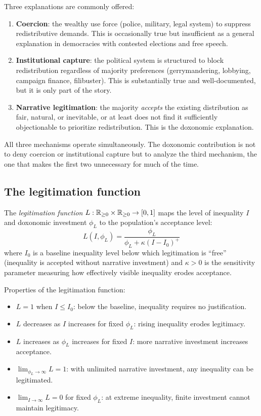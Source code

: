 Three explanations are commonly offered:
\begin{enumerate}
  \item \textbf{Coercion}: the wealthy use force (police, military, legal system) to suppress redistributive demands.
  This is occasionally true but insufficient as a general explanation in democracies with contested elections and free speech.

  \item \textbf{Institutional capture}: the political system is structured to block redistribution regardless of majority preferences (gerrymandering, lobbying, campaign finance, filibuster).
  This is substantially true and well-documented, but it is only part of the story.

  \item \textbf{Narrative legitimation}: the majority \emph{accepts} the existing distribution as fair, natural, or inevitable, or at least does not find it sufficiently objectionable to prioritize redistribution.
  This is the doxonomic explanation.
\end{enumerate}

All three mechanisms operate simultaneously.
The doxonomic contribution is not to deny coercion or institutional capture but to analyze the third mechanism, the one that makes the first two unnecessary for much of the time.

\subsection{The legitimation function}

\begin{definition}
\label{def:legitimation}
The \emph{legitimation function} $L: \mathbb{R}_{\geq 0} \times \mathbb{R}_{\geq 0} \to [0,1]$ maps the level of inequality $I$ and doxonomic investment $\phi_L$ to the population's acceptance level:
\[
  L(I, \phi_L) = \frac{\phi_L}{\phi_L + \kappa(I - I_0)^+}
\]
where $I_0$ is a baseline inequality level below which legitimation is ``free'' (inequality is accepted without narrative investment) and $\kappa > 0$ is the sensitivity parameter measuring how effectively visible inequality erodes acceptance.
\end{definition}

Properties of the legitimation function:
\begin{itemize}[nosep]
  \item $L = 1$ when $I \leq I_0$: below the baseline, inequality requires no justification.
  \item $L$ decreases as $I$ increases for fixed $\phi_L$: rising inequality erodes legitimacy.
  \item $L$ increases as $\phi_L$ increases for fixed $I$: more narrative investment increases acceptance.
  \item $\lim_{\phi_L \to \infty} L = 1$: with unlimited narrative investment, any inequality can be legitimated.
  \item $\lim_{I \to \infty} L = 0$ for fixed $\phi_L$: at extreme inequality, finite investment cannot maintain legitimacy.
\end{itemize}

